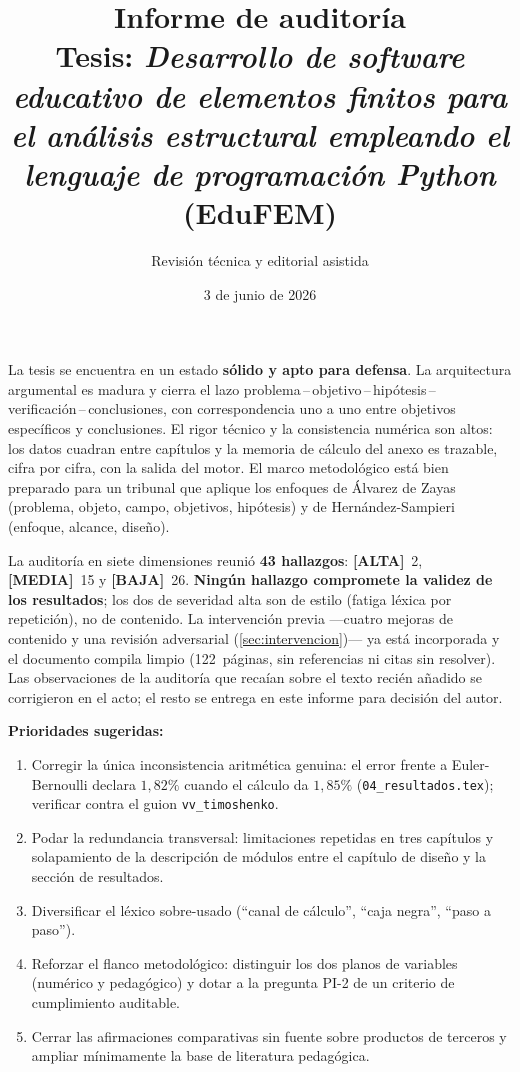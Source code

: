 \documentclass[11pt,a4paper]{article}
\title{\vspace{-1.2cm}\textbf{Informe de auditoría}\\[2pt]
\large Tesis: \textit{Desarrollo de software educativo de elementos finitos para el análisis estructural empleando el lenguaje de programación Python} (EduFEM)}
\author{Revisión técnica y editorial asistida}
\date{3 de junio de 2026}
\newcommand{\sevalta}{\textcolor{cAlta}{\textbf{[ALTA]}}}
\newcommand{\sevmedia}{\textcolor{cMedia}{\textbf{[MEDIA]}}}
\newcommand{\sevbaja}{\textcolor{cBaja}{\textbf{[BAJA]}}}
\newcommand{\fileref}[1]{\texttt{\small #1}}
\begin{document}
\maketitle
\thispagestyle{fancy}

\begin{execbox}
La tesis se encuentra en un estado \textbf{sólido y apto para defensa}. La arquitectura
argumental es madura y cierra el lazo problema\,--\,objetivo\,--\,hipótesis\,--\,verificación\,--\,conclusiones,
con correspondencia uno a uno entre objetivos específicos y conclusiones. El rigor técnico y la
consistencia numérica son altos: los datos cuadran entre capítulos y la memoria de cálculo del
anexo es trazable, cifra por cifra, con la salida del motor. El marco metodológico está bien
preparado para un tribunal que aplique los enfoques de Álvarez de Zayas (problema, objeto, campo,
objetivos, hipótesis) y de Hernández-Sampieri (enfoque, alcance, diseño).

\medskip
La auditoría en siete dimensiones reunió \textbf{43 hallazgos}: \sevalta~2, \sevmedia~15 y
\sevbaja~26. \textbf{Ningún hallazgo compromete la validez de los resultados}; los dos de severidad
alta son de estilo (fatiga léxica por repetición), no de contenido. La intervención previa —cuatro
mejoras de contenido y una revisión adversarial (\autoref{sec:intervencion})— ya está incorporada y
el documento compila limpio (122~páginas, sin referencias ni citas sin resolver). Las observaciones
de la auditoría que recaían sobre el texto recién añadido se corrigieron en el acto; el resto se
entrega en este informe para decisión del autor.

\medskip
\noindent\textbf{Prioridades sugeridas:}
\begin{enumerate}[leftmargin=1.6em,nosep]
  \item Corregir la única inconsistencia aritmética genuina: el error frente a Euler-Bernoulli
  declara \(1{,}82\%\) cuando el cálculo da \(1{,}85\%\) (\fileref{04\_resultados.tex}); verificar
  contra el guion \fileref{vv\_timoshenko}.
  \item Podar la redundancia transversal: limitaciones repetidas en tres capítulos y solapamiento de
  la descripción de módulos entre el capítulo de diseño y la sección de resultados.
  \item Diversificar el léxico sobre-usado (``canal de cálculo'', ``caja negra'', ``paso a paso'').
  \item Reforzar el flanco metodológico: distinguir los dos planos de variables (numérico y
  pedagógico) y dotar a la pregunta PI-2 de un criterio de cumplimiento auditable.
  \item Cerrar las afirmaciones comparativas sin fuente sobre productos de terceros y ampliar
  mínimamente la base de literatura pedagógica.
\end{enumerate}
\end{execbox}
\end{document}
